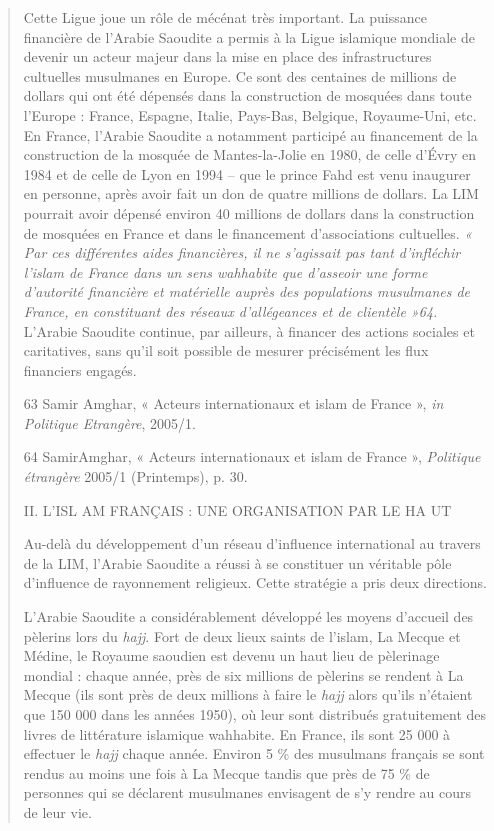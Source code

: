 \begin{quote}
Cette Ligue joue un rôle de mécénat très important. La puissance
financière de l'Arabie Saoudite a permis à la Ligue islamique mondiale
de devenir un acteur majeur dans la mise en place des infrastructures
cultuelles musulmanes en Europe. Ce sont des centaines de millions de
dollars qui ont été dépensés dans la construction de mosquées dans toute
l'Europe : France, Espagne, Italie, Pays-Bas, Belgique, Royaume-Uni,
etc. En France, l'Arabie Saoudite a notamment participé au financement
de la construction de la mosquée de Mantes-la-Jolie en 1980, de celle
d'Évry en 1984 et de celle de Lyon en 1994 -- que le prince Fahd est
venu inaugurer en personne, après avoir fait un don de quatre millions
de dollars. La LIM pourrait avoir dépensé environ 40 millions de dollars
dans la construction de mosquées en France et dans le financement
d'associations cultuelles. \emph{« Par ces différentes aides
financières, il ne s'agissait pas tant d'infléchir l'islam de France
dans un sens wahhabite que d'asseoir une forme d'autorité financière et
matérielle auprès des populations musulmanes de France, en constituant
des réseaux d'allégeances et de clientèle »64.} L'Arabie Saoudite
continue, par ailleurs, à financer des actions sociales et caritatives,
sans qu'il soit possible de mesurer précisément les flux financiers
engagés.

63 Samir Amghar, « Acteurs internationaux et islam de France », \emph{in
Politique Etrangère}, 2005/1.

64 SamirAmghar, « Acteurs internationaux et islam de France »,
\emph{Politique étrangère} 2005/1 (Printemps), p. 30.

II. L'ISL AM FRANÇAIS : UNE ORGANISATION PAR LE HA UT

Au-delà du développement d'un réseau d'influence international au
travers de la LIM, l'Arabie Saoudite a réussi à se constituer un
véritable pôle d'influence de rayonnement religieux. Cette stratégie a
pris deux directions.

L'Arabie Saoudite a considérablement développé les moyens d'accueil des
pèlerins lors du \emph{hajj}. Fort de deux lieux saints de l'islam, La
Mecque et Médine, le Royaume saoudien est devenu un haut lieu de
pèlerinage mondial : chaque année, près de six millions de pèlerins se
rendent à La Mecque (ils sont près de deux millions à faire le
\emph{hajj} alors qu'ils n'étaient que 150 000 dans les années 1950), où
leur sont distribués gratuitement des livres de littérature islamique
wahhabite. En France, ils sont 25 000 à effectuer le \emph{hajj} chaque
année. Environ 5 \% des musulmans français se sont rendus au moins une
fois à La Mecque tandis que près de 75 \% de personnes qui se déclarent
musulmanes envisagent de s'y rendre au cours de leur vie.


\end{quote}
